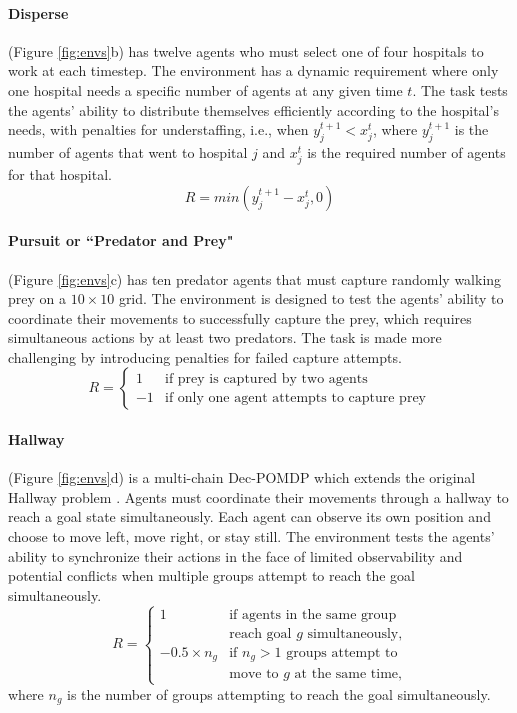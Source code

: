 \paragraph{Disperse} (Figure \ref{fig:envs}b) has twelve agents who must select one of four hospitals to work at each timestep. The environment has a dynamic requirement where only one hospital needs a specific number of agents at any given time $t$. The task tests the agents' ability to distribute themselves efficiently according to the hospital's needs, with penalties for understaffing, i.e., when \(y_j^{t+1} < x_j^t\), where $y_j^{t+1}$ is the number of agents that went to hospital $j$ and $x_j^t$ is the required number of agents for that hospital. \[ R = min(y_j^{t+1} - x_j^t, 0) \]

\paragraph{Pursuit or ``Predator and Prey"} (Figure \ref{fig:envs}c) has ten predator agents that must capture randomly walking prey on a $10 \times 10$ grid. The environment is designed to test the agents' ability to coordinate their movements to successfully capture the prey, which requires simultaneous actions by at least two predators. The task is made more challenging by introducing penalties for failed capture attempts. \[ R = 
\begin{cases} 
1 & \text{if prey is captured by two agents} \\
-1 & \text{if only one agent attempts to capture prey}
\end{cases}
\]

\paragraph{Hallway} (Figure \ref{fig:envs}d) is a multi-chain Dec-POMDP \cite{oliehoek2016concise} which extends the original Hallway problem \cite{wang2019learning}. Agents must coordinate their movements through a hallway to reach a goal state simultaneously. Each agent can observe its own position and choose to move left, move right, or stay still. The environment tests the agents' ability to synchronize their actions in the face of limited observability and potential conflicts when multiple groups attempt to reach the goal simultaneously. \[ R = 
\begin{cases} 
1 & \text{if agents in the same group} \\ 
& \text{reach goal $g$ simultaneously,} \\
-0.5 \times n_g & \text{if $n_g > 1$ groups attempt to} \\
                & \text{move to $g$ at the same time,}
\end{cases}
\]
where $n_g$ is the number of groups attempting to reach the goal simultaneously.


